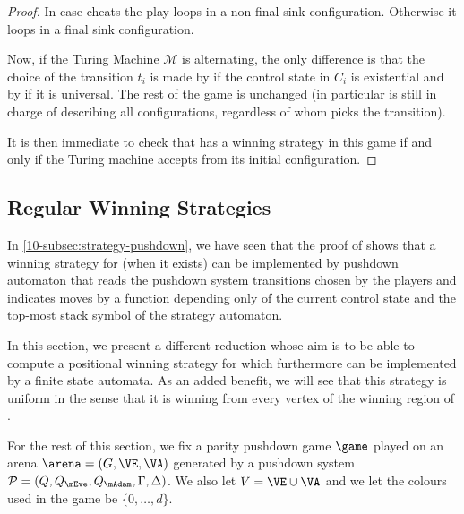 \begin{proof}
In case \Eve cheats the play loops in a non-final sink configuration. Otherwise it loops in a final sink configuration.

Now, if the Turing Machine $\mathcal{M}$ is alternating, the only difference is that the choice of the transition $t_i$ is made by \Eve if the control state in $C_i$ is existential and by \Adam if it is universal. The rest of the game is unchanged (in particular \Eve is still in charge of describing all configurations, regardless of whom picks the transition).

It is then immediate to check that \Eve has a winning strategy in this game if and only if the Turing machine accepts from its initial configuration.	
\end{proof}




\subsection{Regular Winning Strategies}
\label{10-subsec:regular-strat}


In \cref{10-subsec:strategy-pushdown}, we have seen that the proof of  shows that a winning strategy for \Eve (when it exists) can be implemented by pushdown automaton that reads the pushdown system transitions chosen by the players and indicates \Eve moves by a function depending only of the current control state and the top-most stack symbol of the strategy automaton. 

In this section, we present a different reduction whose aim is to be able to compute a positional winning strategy for \Eve which furthermore can be implemented by a finite state automata. As an added benefit, we will see that this strategy is uniform in the sense that it is winning from every vertex of the winning region of \Eve.

For the rest of this section, we fix a parity pushdown game $\game$ played on an arena $\arena = (G,\VE,\VA)$ generated by a pushdown system $\PDS = (Q,Q_{\mEve}, Q_{\mAdam}, \Gamma,\Delta)$. We also let $V=\VE\cup\VA$ and we let the colours used in the game be $\{0,\dots,d\}$.


